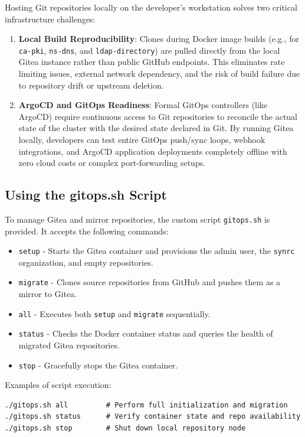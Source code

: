 \documentclass{article}
\begin{document}
Hosting Git repositories locally on the developer's workstation solves two critical infrastructure challenges:

\begin{enumerate}
    \item \textbf{Local Build Reproducibility}: Clones during Docker image
          builds (e.g., for \texttt{ca-pki}, \texttt{ns-dns}, and \texttt{ldap-directory})
          are pulled directly from the local Gitea instance rather than public GitHub endpoints.
          This eliminates rate limiting issues, external network dependency, and the risk of
          build failure due to repository drift or upstream deletion.
    \item \textbf{ArgoCD and GitOps Readiness}: Formal GitOps controllers (like ArgoCD) require
          continuous access to Git repositories to reconcile the actual state of the cluster
          with the desired state declared in Git. By running Gitea locally,
          developers can test entire GitOps push/sync loops, webhook integrations,
          and ArgoCD application deployments completely offline with zero cloud costs
          or complex port-forwarding setups.
\end{enumerate}

\subsection{Using the gitops.sh Script}

To manage Gitea and mirror repositories, the custom script \texttt{gitops.sh} is provided. It accepts the following commands:
\begin{itemize}
    \item \texttt{setup} - Starts the Gitea container and provisions the admin user, the \texttt{synrc} organization, and empty repositories.
    \item \texttt{migrate} - Clones source repositories from GitHub and pushes them as a mirror to Gitea.
    \item \texttt{all} - Executes both \texttt{setup} and \texttt{migrate} sequentially.
    \item \texttt{status} - Checks the Docker container status and queries the health of migrated Gitea repositories.
    \item \texttt{stop} - Gracefully stops the Gitea container.
\end{itemize}

Examples of script execution:
\begin{verbatim}
./gitops.sh all         # Perform full initialization and migration
./gitops.sh status      # Verify container state and repo availability
./gitops.sh stop        # Shut down local repository node
\end{verbatim}
\end{document}
